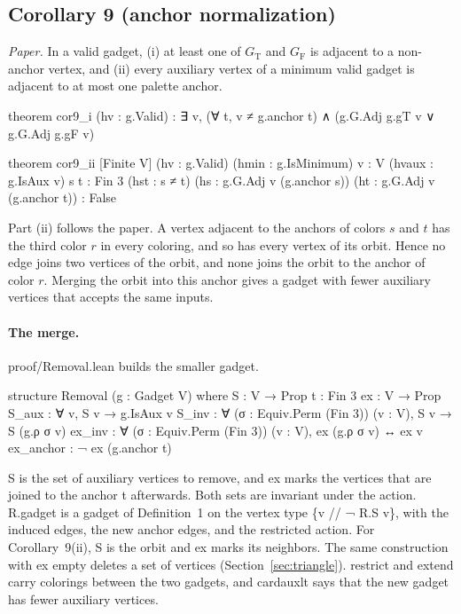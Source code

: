 \documentclass[11pt,a4paper]{article}
\newcommand{\leanus}{\textunderscore\allowbreak}
\newcommand{\lean}[1]{{\ttfamily\let\_\leanus #1}}
\newcommand{\GT}{G_{\mathrm{T}}}
\newcommand{\GF}{G_{\mathrm{F}}}
\begin{document}
\subsection{Corollary 9 (anchor normalization)}
\emph{Paper.} In a valid gadget, (i) at least one of $\GT$ and $\GF$ is
adjacent to a non-anchor vertex, and (ii) every auxiliary vertex of a
minimum valid gadget is adjacent to at most one palette anchor.
\begin{code}
theorem cor9_i (hv : g.Valid) :
    ∃ v, (∀ t, v ≠ g.anchor t) ∧ (g.G.Adj g.gT v ∨ g.G.Adj g.gF v)

theorem cor9_ii [Finite V] (hv : g.Valid) (hmin : g.IsMinimum) {v : V} (hvaux : g.IsAux v)
    {s t : Fin 3} (hst : s ≠ t) (hs : g.G.Adj v (g.anchor s)) (ht : g.G.Adj v (g.anchor t)) :
    False
\end{code}
Part (ii) follows the paper. A vertex adjacent to the anchors of colors $s$
and $t$ has the third color $r$ in every coloring, and so has every vertex
of its orbit. Hence no edge joins two vertices of the orbit, and none joins
the orbit to the anchor of color $r$. Merging the orbit into this anchor
gives a gadget with fewer auxiliary vertices that accepts the same inputs.

\paragraph{The merge.} \lean{proof/Removal.lean} builds the smaller gadget.
\begin{code}
structure Removal (g : Gadget V) where
  S : V → Prop
  t : Fin 3
  ex : V → Prop
  S_aux : ∀ v, S v → g.IsAux v
  S_inv : ∀ (σ : Equiv.Perm (Fin 3)) (v : V), S v → S (g.ρ σ v)
  ex_inv : ∀ (σ : Equiv.Perm (Fin 3)) (v : V), ex (g.ρ σ v) ↔ ex v
  ex_anchor : ¬ ex (g.anchor t)
\end{code}
\lean{S} is the set of auxiliary vertices to remove, and \lean{ex} marks the
vertices that are joined to the anchor \lean{t} afterwards. Both sets are
invariant under the action. \lean{R.gadget} is a gadget of Definition~1 on
the vertex type \lean{\{v // ¬ R.S v\}}, with the induced edges, the new
anchor edges, and the restricted action. For Corollary~9(ii), \lean{S} is
the orbit and \lean{ex} marks its neighbors. The same construction with
\lean{ex} empty deletes a set of vertices (Section~\ref{sec:triangle}).
\lean{restrict} and \lean{extend} carry colorings between the two gadgets,
and \lean{card\_aux\_lt} says that the new gadget has fewer auxiliary
vertices.
\end{document}
